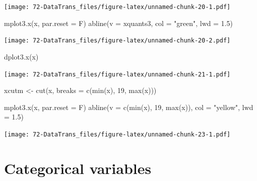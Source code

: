 \documentclass[
]{book}
\newenvironment{Shaded}{\begin{snugshade}}{\end{snugshade}}
\newcommand{\AttributeTok}[1]{\textcolor[rgb]{0.77,0.63,0.00}{#1}}
\newcommand{\DecValTok}[1]{\textcolor[rgb]{0.00,0.00,0.81}{#1}}
\newcommand{\FloatTok}[1]{\textcolor[rgb]{0.00,0.00,0.81}{#1}}
\newcommand{\FunctionTok}[1]{\textcolor[rgb]{0.00,0.00,0.00}{#1}}
\newcommand{\NormalTok}[1]{#1}
\newcommand{\OtherTok}[1]{\textcolor[rgb]{0.56,0.35,0.01}{#1}}
\newcommand{\StringTok}[1]{\textcolor[rgb]{0.31,0.60,0.02}{#1}}
\begin{document}
\texttt{[image: 72-DataTrans\_files/figure-latex/unnamed-chunk-20-1.pdf]}

\begin{Shaded}
\begin{Highlighting}[]
\FunctionTok{mplot3.x}\NormalTok{(x, }\AttributeTok{par.reset =}\NormalTok{ F)}
\FunctionTok{abline}\NormalTok{(}\AttributeTok{v =}\NormalTok{ xquants3, }\AttributeTok{col =} \StringTok{"green"}\NormalTok{, }\AttributeTok{lwd =} \FloatTok{1.5}\NormalTok{)}
\end{Highlighting}
\end{Shaded}

\texttt{[image: 72-DataTrans\_files/figure-latex/unnamed-chunk-20-2.pdf]}

\begin{Shaded}
\begin{Highlighting}[]
\FunctionTok{dplot3.x}\NormalTok{(x)}
\end{Highlighting}
\end{Shaded}

\texttt{[image: 72-DataTrans\_files/figure-latex/unnamed-chunk-21-1.pdf]}

\begin{Shaded}
\begin{Highlighting}[]
\NormalTok{xcutm }\OtherTok{\textless{}{-}} \FunctionTok{cut}\NormalTok{(x, }\AttributeTok{breaks =} \FunctionTok{c}\NormalTok{(}\FunctionTok{min}\NormalTok{(x), }\DecValTok{19}\NormalTok{, }\FunctionTok{max}\NormalTok{(x)))}
\end{Highlighting}
\end{Shaded}

\begin{Shaded}
\begin{Highlighting}[]
\FunctionTok{mplot3.x}\NormalTok{(x, }\AttributeTok{par.reset =}\NormalTok{ F)}
\FunctionTok{abline}\NormalTok{(}\AttributeTok{v =} \FunctionTok{c}\NormalTok{(}\FunctionTok{min}\NormalTok{(x), }\DecValTok{19}\NormalTok{, }\FunctionTok{max}\NormalTok{(x)), }\AttributeTok{col =} \StringTok{"yellow"}\NormalTok{, }\AttributeTok{lwd =} \FloatTok{1.5}\NormalTok{)}
\end{Highlighting}
\end{Shaded}

\texttt{[image: 72-DataTrans\_files/figure-latex/unnamed-chunk-23-1.pdf]}

\hypertarget{categorical-variables}{%
\section{Categorical variables}\label{categorical-variables}}
\end{document}

